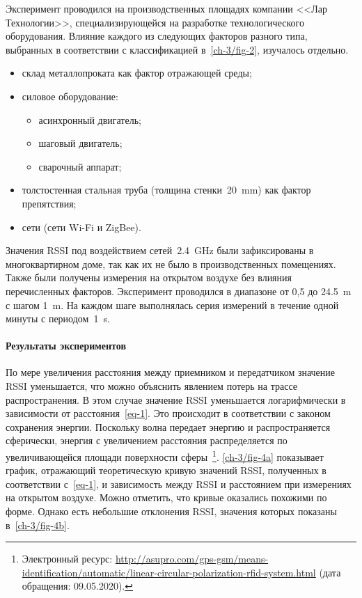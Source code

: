 Эксперимент проводился на производственных площадях компании <<Лар Технологии>>, специализирующейся на разработке технологического оборудования. Влияние каждого из следующих факторов разного типа, выбранных в соответствии с классификацией в~\cref{ch-3/fig-2}, изучалось отдельно.

\begin{itemize}
\item склад металлопроката как фактор отражающей среды;
\item силовое оборудование:
	\begin{itemize}
		\item асинхронный двигатель;
		\item шаговый двигатель;
		\item сварочный аппарат;
	\end{itemize}
\item толстостенная стальная труба (толщина стенки~\SI{20}{\milli\meter}) как фактор препятствия;
\item сети (сети Wi-Fi и ZigBee).
\end{itemize}

Значения RSSI под воздействием сетей~\SI{2,4}{\giga\hertz} были зафиксированы в многоквартирном доме, так как их не было в производственных помещениях. Также были получены измерения на открытом воздухе без влияния перечисленных факторов. Эксперимент проводился в диапазоне от 0,5 до \SI{24,5}{\meter} с шагом \SI{1}{\meter}. На каждом шаге выполнялась серия измерений в течение одной минуты с периодом~\SI{1}{\second}.

\paragraph{Результаты экспериментов}

По мере увеличения расстояния между приемником и передатчиком значение RSSI уменьшается, что можно объяснить явлением потерь на трассе распространения. В этом случае значение RSSI уменьшается логарифмически в зависимости от расстояния~\cref{eq-1}. Это происходит в соответствии с законом сохранения энергии. Поскольку волна передает энергию и распространяется сферически, энергия с увеличением расстояния распределяется по увеличивающейся площади поверхности сферы~\footnote{Электронный ресурс: {\tiny\url{http://asupro.com/gps-gsm/means-identification/automatic/linear-circular-polarization-rfid-system.html}} (дата обращения: 09.05.2020).}. \cref{ch-3/fig-4a} показывает график, отражающий теоретическую кривую значений RSSI, полученных в соответствии с~\cref{eq-1}, и зависимость между RSSI и расстоянием при измерениях на открытом воздухе. Можно отметить, что кривые оказались похожими по форме. Однако есть небольшие отклонения RSSI, значения которых показаны в~\cref{ch-3/fig-4b}.

